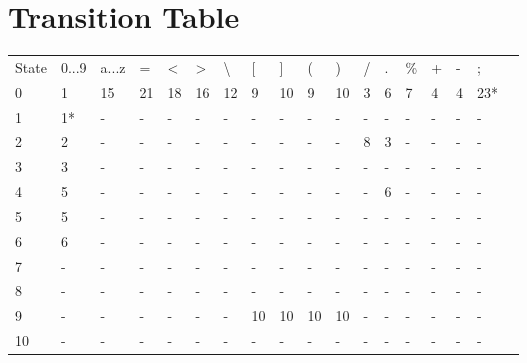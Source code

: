 \documentclass[12pt]{article}
\begin{document}
{    \section {Transition Table}
    \begin{table}[H]
    \begin{tabular}{|l|l|l|l|l|l|l|l|l|l|l|l|l|l|l|l|l|l}
    \cline{1-17}
   State & 0...9 & a...z & =  & \textless{} & \textgreater{} & \textbackslash{} & {[} & {]} & (  & )  & / & . & \% & + & - & ;   &  \\ \cline{1-17}
    0     & 1     & 15    & 21 & 18          & 16             & 12               & 9   & 10  & 9  & 10 & 3 & 6 & 7  & 4 & 4 & 23* &  \\ \cline{1-17}
    1     & 1*    & -     & -  & -           & -              & -                & -   & -   & -  & -  & - & - & -  & - & - & -   &  \\ \cline{1-17}
    2     & 2     & -     & -  & -           & -              & -                & -   & -   & -  & -  & 8 & 3 & -  & - & - & -   &  \\ \cline{1-17}
    3     & 3     & -     & -  & -           & -              & -                & -   & -   & -  & -  & - & - & -  & - & - & -   &  \\ \cline{1-17}
    4     & 5     & -     & -  & -           & -              & -                & -   & -   & -  & -  & - & 6 & -  & - & - & -   &  \\ \cline{1-17}
    5     & 5     & -     & -  & -           & -              & -                & -   & -   & -  & -  & - & - & -  & - & - & -   &  \\ \cline{1-17}
    6     & 6     & -     & -  & -           & -              & -                & -   & -   & -  & -  & - & - & -  & - & - & -   &  \\ \cline{1-17}
    7     & -     & -     & -  & -           & -              & -                & -   & -   & -  & -  & - & - & -  & - & - & -   &  \\ \cline{1-17}
    8     & -     & -     & -  & -           & -              & -                & -   & -   & -  & -  & - & - & -  & - & - & -   &  \\ \cline{1-17}
    9     & -     & -     & -  & -           & -              & -                & 10  & 10  & 10 & 10 & - & - & -  & - & - & -   &  \\ \cline{1-17}
    10    & -     & -     & -  & -           & -              & -                & -   & -   & -  & -  & - & - & -  & - & - & -   &  \\ \cline{1-17}

\end{tabular}
\end{table}}
\end{document}
